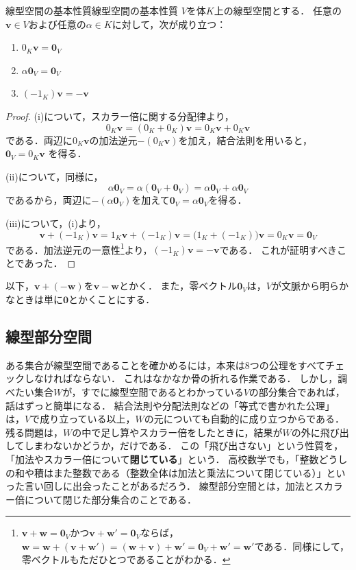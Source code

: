 \begin{prop}{線型空間の基本性質}{線型空間の基本性質}
  $V$を体$K$上の線型空間とする．
  任意の$\bm{v} \in V$および任意の$\alpha \in K$に対して，次が成り立つ：
  \begin{enumerate}[label=(\roman*),leftmargin=3.2em]
    \item $0_K \bm{v} = \bm{0}_V$
    \item $\alpha \bm{0}_V = \bm{0}_V$
    \item $(-1_K)\bm{v} = -\bm{v}$
  \end{enumerate}
\end{prop}

\begin{tleftbar}
\begin{proof}
  (i)について，スカラー倍に関する分配律より，
  \[
    0_K \bm{v} = (0_K + 0_K)\bm{v} = 0_K \bm{v} + 0_K \bm{v}
  \]
  である．両辺に$0_K \bm{v}$の加法逆元$-(0_K \bm{v})$を加え，結合法則を用いると，
  $\bm{0}_V = 0_K \bm{v}$
  を得る．

  (ii)について，同様に，
  \[
    \alpha \bm{0}_V = \alpha(\bm{0}_V + \bm{0}_V) = \alpha \bm{0}_V + \alpha \bm{0}_V
  \]
  であるから，両辺に$-(\alpha \bm{0}_V)$を加えて$\bm{0}_V = \alpha \bm{0}_V$を得る．

  (iii)について，(i)より，
  \[
    \bm{v} + (-1_K)\bm{v} = 1_K \bm{v} + (-1_K)\bm{v} = \bigl(1_K + (-1_K)\bigr)\bm{v} = 0_K \bm{v} = \bm{0}_V
  \]
  である．加法逆元の一意性\footnote{$\bm{v}+\bm{w}=\bm{0}_V$かつ$\bm{v}+\bm{w}'=\bm{0}_V$ならば，$\bm{w}=\bm{w}+(\bm{v}+\bm{w}')=(\bm{w}+\bm{v})+\bm{w}'=\bm{0}_V+\bm{w}'=\bm{w}'$である．同様にして，零ベクトルもただひとつであることがわかる．}より，$(-1_K)\bm{v} = -\bm{v}$である．
  これが証明すべきことであった．
\end{proof}
\end{tleftbar}

以下，$\bm{v}+(-\bm{w})$を$\bm{v}-\bm{w}$とかく．
また，零ベクトル$\bm{0}_V$は，$V$が文脈から明らかなときは単に$\bm{0}$とかくことにする．

\subsection{線型部分空間}

ある集合が線型空間であることを確かめるには，本来は$8$つの公理をすべてチェックしなければならない．
これはなかなか骨の折れる作業である．
しかし，調べたい集合$W$が，すでに線型空間であるとわかっている$V$の部分集合であれば，話はずっと簡単になる．
結合法則や分配法則などの「等式で書かれた公理」は，$V$で成り立っている以上，$W$の元についても自動的に成り立つからである．
残る問題は，$W$の中で足し算やスカラー倍をしたときに，結果が$W$の外に飛び出してしまわないかどうか，だけである．
この「飛び出さない」という性質を，「加法やスカラー倍について\textbf{閉じている}」という．
高校数学でも，「整数どうしの和や積はまた整数である（整数全体は加法と乗法について閉じている）」といった言い回しに出会ったことがあるだろう．
線型部分空間とは，加法とスカラー倍について閉じた部分集合のことである．

